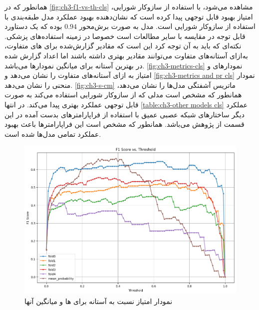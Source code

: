 همانطور که در 
\autoref{fig:ch3-f1-vs-th-cls}
 مشاهده می‌شود، با استفاده از سازوکار شورایی، امتیاز  بهبود قابل توجهی پیدا کرده است که نشان‌دهنده بهبود عملکرد مدل طبقه‌بندی با استفاده از سازوکار شورایی است.
  مدل به صورت برش‌محور 
 $0.94$ 
 بوده که یک دستاورد قابل توجه در مقایسه با سایر مطالعات است خصوصا در زمینه استفاده‌های پزشکی. نکته‌ای که باید به آن توجه کرد این است که مقادیر گزارش‌شده برای
 های 
 متفاوت،‌ به‌ازای آستانه‌های متفاوت می‌توانند مقادیر بهتری داشته باشند اما اعداد گزارش شده در بهترین آستانه برای میانگین نمودارها می‌باشد.
\autoref{fig:ch3-metrics-cls}
نمودارهای
			 و امتیاز
			به ازای آستانه‌های متفاوت را نشان می‌دهد و 
\autoref{fig:ch3-metrics and pr cls}
نمودار منحنی 
را نشان می‌دهد.
\autoref{fig:ch3-s-cm}
ماتریس آشفتگی مدل‌ها را نشان می‌دهد،‌ همانطور که مشخص است مدلی که از سازوکار شورایی استفاده می‌کند به صورت قابل توجهی عملکرد بهتری پیدا می‌کند. در انتها 
\autoref{table:ch3-other models cls}
عملکرد دیگر ساختارهای شبکه عصبی عمیق با استفاده از فراپارامترهای بدست آمده در این قسمت از پژوهش می‌باشد. همانطور که مشخص است این فراپارامتر‌ها باعث بهبود عملکرد تمامی مدل‌ها شده است.
\begin{figure}[h]
\centering
\includegraphics[width=1.0\linewidth]{Images/Chapter3/f1-vs-th-cls}
\caption{نمودار امتیاز  نسبت به آستانه برای ها و میانگین آنها}
\label{fig:ch3-f1-vs-th-cls}

\end{figure}


